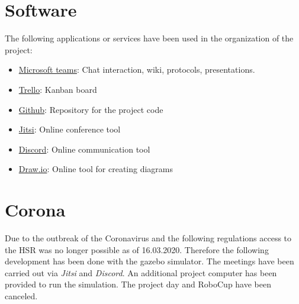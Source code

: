 \documentclass[main.tex]{subfiles}
\begin{document}
	\section{Software}
	The following applications or services have been used in the organization of the project:
	\begin{itemize}
		\item \href{https://www.microsoft.com/de-de/microsoft-365/microsoft-teams/group-chat-software}{Microsoft teams}: Chat interaction, wiki, protocols, presentations.
		\item \href{https://trello.com/de}{Trello}: Kanban board
		\item \href{https://github.com/}{Github}: Repository for the project code
		\item \href{https://jitsi.org/}{Jitsi}: Online conference tool
		\item \href{https://discord.com/}{Discord}: Online communication tool
		\item \href{https://app.diagrams.net/}{Draw.io}: Online tool for creating diagrams 
	\end{itemize}  

	\section{Corona}
	Due to the outbreak of the Coronavirus and the following regulations access to the HSR was no longer possible as of 16.03.2020. Therefore the following development has been done with the gazebo simulator.
	The meetings have been carried out via \textit{Jitsi} and \textit{Discord}. An additional project computer has been provided to run the simulation.
	The project day and RoboCup have been canceled.
	
\end{document}
